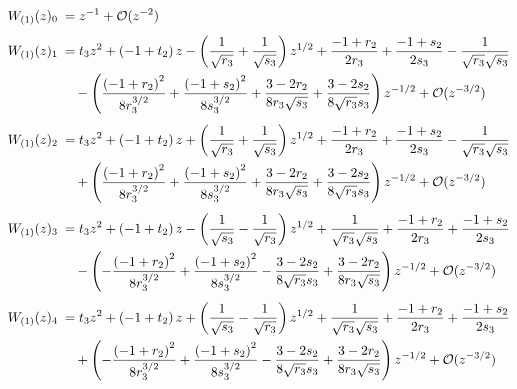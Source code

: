 \begin{sheetasymptotics}
    \begin{align*}
        \sheetlabel{W_{(1)}(z)_{0}} & ={}z^{-1}+\mathcal O(z^{-2}) \\[4pt]
        \sheetlabel{W_{(1)}(z)_{1}} & ={}t_3z^{2}+\left(-1 + t_2\right)z-\left(\frac{1}{\sqrt{r_3}} + \frac{1}{\sqrt{s_3}}\right)z^{1/2}+\frac{-1 + r_2}{2 r_3} + \frac{-1 + s_2}{2 s_3} - \frac{1}{\sqrt{r_3} \sqrt{s_3}} \\*
                                    & \quad{}-\left(\frac{\left(-1 + r_2\right)^{2}}{8 r_3^{3/2}} + \frac{\left(-1 + s_2\right)^{2}}{8 s_3^{3/2}} + \frac{3 - 2 r_2}{8 r_3 \sqrt{s_3}} + \frac{3 - 2 s_2}{8 \sqrt{r_3} s_3}\right)z^{-1/2}+\mathcal O(z^{-3/2}) \\[4pt]
        \sheetlabel{W_{(1)}(z)_{2}} & ={}t_3z^{2}+\left(-1 + t_2\right)z+\left(\frac{1}{\sqrt{r_3}} + \frac{1}{\sqrt{s_3}}\right)z^{1/2}+\frac{-1 + r_2}{2 r_3} + \frac{-1 + s_2}{2 s_3} - \frac{1}{\sqrt{r_3} \sqrt{s_3}} \\*
                                    & \quad{}+\left(\frac{\left(-1 + r_2\right)^{2}}{8 r_3^{3/2}} + \frac{\left(-1 + s_2\right)^{2}}{8 s_3^{3/2}} + \frac{3 - 2 r_2}{8 r_3 \sqrt{s_3}} + \frac{3 - 2 s_2}{8 \sqrt{r_3} s_3}\right)z^{-1/2}+\mathcal O(z^{-3/2}) \\[4pt]
        \sheetlabel{W_{(1)}(z)_{3}} & ={}t_3z^{2}+\left(-1 + t_2\right)z-\left(\frac{1}{\sqrt{s_3}} - \frac{1}{\sqrt{r_3}}\right)z^{1/2}+\frac{1}{\sqrt{r_3} \sqrt{s_3}} + \frac{-1 + r_2}{2 r_3} + \frac{-1 + s_2}{2 s_3} \\*
                                    & \quad{}-\left(- \frac{\left(-1 + r_2\right)^{2}}{8 r_3^{3/2}} + \frac{\left(-1 + s_2\right)^{2}}{8 s_3^{3/2}} - \frac{3 - 2 s_2}{8 \sqrt{r_3} s_3} + \frac{3 - 2 r_2}{8 r_3 \sqrt{s_3}}\right)z^{-1/2}+\mathcal O(z^{-3/2}) \\[4pt]
        \sheetlabel{W_{(1)}(z)_{4}} & ={}t_3z^{2}+\left(-1 + t_2\right)z+\left(\frac{1}{\sqrt{s_3}} - \frac{1}{\sqrt{r_3}}\right)z^{1/2}+\frac{1}{\sqrt{r_3} \sqrt{s_3}} + \frac{-1 + r_2}{2 r_3} + \frac{-1 + s_2}{2 s_3} \\*
                                    & \quad{}+\left(- \frac{\left(-1 + r_2\right)^{2}}{8 r_3^{3/2}} + \frac{\left(-1 + s_2\right)^{2}}{8 s_3^{3/2}} - \frac{3 - 2 s_2}{8 \sqrt{r_3} s_3} + \frac{3 - 2 r_2}{8 r_3 \sqrt{s_3}}\right)z^{-1/2}+\mathcal O(z^{-3/2}) \\[4pt]

\end{align*}
\end{sheetasymptotics}
